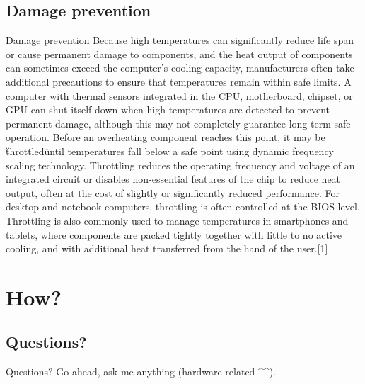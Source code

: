 \documentclass{beamer}
\begin{document}
\subsection{Damage prevention}

\begin{frame}{Damage prevention}
Because high temperatures can significantly reduce life span or cause permanent damage to components, and the heat output of components can sometimes exceed the computer's cooling capacity, manufacturers often take additional precautions to ensure that temperatures remain within safe limits. A computer with thermal sensors integrated in the CPU, motherboard, chipset, or GPU can shut itself down when high temperatures are detected to prevent permanent damage, although this may not completely guarantee long-term safe operation. Before an overheating component reaches this point, it may be \"throttled\" until temperatures fall below a safe point using dynamic frequency scaling technology. Throttling reduces the operating frequency and voltage of an integrated circuit or disables non-essential features of the chip to reduce heat output, often at the cost of slightly or significantly reduced performance. For desktop and notebook computers, throttling is often controlled at the BIOS level. Throttling is also commonly used to manage temperatures in smartphones and tablets, where components are packed tightly together with little to no active cooling, and with additional heat transferred from the hand of the user.[1]
\end{frame}


\section{How?}


\subsection{Questions?}

\begin{frame}{Questions?}
Go ahead, ask me anything (hardware related \textasciicircum \textasciicircum).
\printbibliography
\end{frame}
\end{document}
